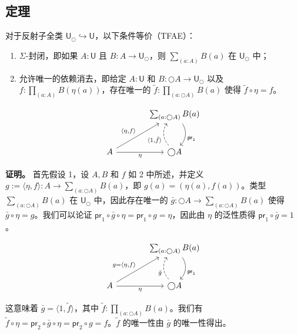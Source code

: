 \documentclass[UTF8]{ctexart}
\theoremstyle{definition}
\newcommand{\U}{\mathsf{U}}
\newcommand{\modal}{\bigcirc}
\begin{document}
\subsection{定理}

对于反射子全类 $\U_{\modal} \hookrightarrow \U$，以下条件等价（TFAE）：
\begin{enumerate}
    \item $\Sigma$-封闭，即如果 $A:\U$ 且 $B : A \to \U_{\modal}$，则 $\sum_{(a:A)} B(a)$ 在 $\U_{\modal}$ 中；
    
    \item 允许唯一的依赖消去，即给定 $A:\U$ 和 $B : \modal A \to \U_{\modal}$ 以及 $f : \prod_{(a:A)} B(\eta(a))$，存在唯一的 $\tilde{f} : \prod_{(a:\modal A)} B(a)$ 使得 $\tilde{f} \circ \eta = f$。
\end{enumerate}

\begin{center}
\[
\begin{tikzcd}[row sep=large, column sep=large]
& \sum_{(a:\bigcirc A)} B(a) \arrow[d, "{\mathsf{pr}_1}", bend left=40] \\
A \arrow[ru, "{\langle \eta, f \rangle}"] \arrow[r, "\eta"'] & \bigcirc A \arrow[u, "{\langle 1, \tilde{f} \rangle}", dashed, bend left=40]
\end{tikzcd}
\]
\end{center}

\noindent\textbf{证明。} 首先假设 1，设 $A, B$ 和 $f$ 如 2 中所述，并定义 $g := \langle\eta, f\rangle : A \to \sum_{(a:\modal A)} B(a)$，即 $g(a) = (\eta(a), f(a))$。类型 $\sum_{(a:\modal A)} B(a)$ 在 $\U_{\modal}$ 中，因此存在唯一的 $\bar{g} : \modal A \to \sum_{(a:\modal A)} B(a)$ 使得 $\bar{g} \circ \eta = g$。我们可以论证 $\mathsf{pr}_1 \circ \bar{g} \circ \eta = \mathsf{pr}_1 \circ g = \eta$，因此由 $\eta$ 的泛性质得 $\mathsf{pr}_1 \circ \bar{g} = 1$。
\begin{center}
\[
\begin{tikzcd}[row sep=large, column sep=large]
& \sum_{(a:\bigcirc A)} B(a) \arrow[d, "{\mathsf{pr}_1}", bend left=40] \\
A \arrow[ru, "{g=\langle \eta, f \rangle}"] \arrow[r, "\eta"'] & \bigcirc A \arrow[u, "{\tilde{g}}", dashed, bend left=40]
\end{tikzcd}
\]
\end{center}
这意味着 $\bar{g} = \langle 1, \tilde{f}\rangle$，其中 $\tilde{f} : \prod_{(a:\modal A)} B(a)$。我们有 $\tilde{f} \circ \eta = \mathsf{pr}_2 \circ \bar{g} \circ \eta = \mathsf{pr}_2 \circ g = f$。$\tilde{f}$ 的唯一性由 $\bar{g}$ 的唯一性得出。
\end{document}
